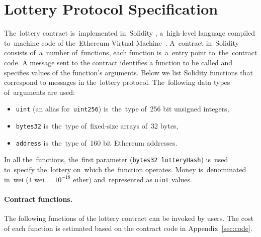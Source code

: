 \documentclass[a4paper]{article}
\begin{document}
\section{Lottery Protocol Specification}
\label{sec:lottery-protocol}
    The~lottery contract is~implemented in~Solidity \cite{SOLIDITY}, a~high-level language compiled to~machine code of
    the~Ethereum Virtual Machine~\cite{WOOD}. A~contract in~Solidity consists of~a~number of~functions, each
    function is~a~entry point to~the~contract code. A message sent to the contract identifies a function to be called
    and specifies values of the function's arguments. Below we list Solidity functions that correspond to messages
    in the~lottery protocol. The~following data types of~arguments are used:
    \begin{itemize}
        \item \texttt{uint} (an alias for~\texttt{uint256}) is~the~type of~256 bit unsigned integers,
        \item \texttt{bytes32} is~the~type of~fixed-size arrays of~32 bytes,
        \item \texttt{address} is~the~type of~160 bit Ethereum addresses.
    \end{itemize}
    In all the~functions, the~first parameter (\texttt{bytes32 lotteryHash}) is~used to~specify the~lottery on~which
    the~function operates. Money is~denominated in~wei ($1$ wei = $10^{-18}$ ether) and~represented as \texttt{uint} values.

    \paragraph{Contract functions.} The following functions of the lottery contract can be invoked by users.
    The cost of each function is estimated based on the contract code in Appendix~\ref{sec:code}.
\end{document}
